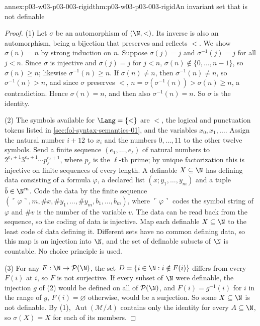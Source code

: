 \begin{annexitem}{annex:p03-w03-p03-003-rigid}{thm:p03-w03-p03-003-rigid}{An invariant set that is not definable}
\begin{proof}
(1) Let \(\sigma\) be an automorphism of \((\N,<)\).  Its inverse is also an
automorphism, being a bijection that preserves and reflects \(<\).  We show
\(\sigma(n)=n\) by strong induction on \(n\).  Suppose \(\sigma(j)=j\) and
\(\sigma^{-1}(j)=j\) for all \(j<n\).  Since \(\sigma\) is injective and
\(\sigma(j)=j\) for \(j<n\), \(\sigma(n)\notin\{0,\ldots,n-1\}\), so
\(\sigma(n)\geq n\); likewise \(\sigma^{-1}(n)\geq n\).  If
\(\sigma(n)\neq n\), then \(\sigma^{-1}(n)\neq n\), so \(\sigma^{-1}(n)>n\),
and since \(\sigma\) preserves \(<\),
\(n=\sigma(\sigma^{-1}(n))>\sigma(n)\geq n\), a contradiction.  Hence
\(\sigma(n)=n\), and then also \(\sigma^{-1}(n)=n\).  So \(\sigma\) is the
identity.

(2) The symbols available for \(\Lang=\{<\}\) are \(<\), the logical and
punctuation tokens listed in \cref{sec:fol-syntax-semantics-01}, and the
variables \(x_0,x_1,\ldots\).  Assign the natural number \(i+12\) to
\(x_i\) and the numbers \(0,\ldots,11\) to the other twelve symbols.  Send a
finite sequence \((e_1,\ldots,e_\ell)\) of natural numbers to
\(2^{e_1+1}3^{e_2+1}\cdots p_\ell^{e_\ell+1}\), where \(p_\ell\) is the
\(\ell\)-th prime; by unique factorization this is injective on finite
sequences of every length.  A definable \(X\subseteq\N\) has defining data
consisting of a formula \(\varphi\), a declared list \((x;y_1,\ldots,y_m)\)
and a tuple \(\bar b\in\N^m\).  Code the data by the finite sequence
\((\ulcorner\varphi\urcorner,m,\#x,\#y_1,\ldots,\#y_m,b_1,\ldots,b_m)\),
where \(\ulcorner\varphi\urcorner\) codes the symbol string of \(\varphi\)
and \(\#v\) is the number of the variable \(v\).  The data can be read back
from the sequence, so the coding of data is injective.  Map each definable
\(X\subseteq\N\) to the least code of data defining it.  Different sets
have no common defining data, so this map is an injection into \(\N\), and
the set of definable subsets of \(\N\) is countable.  No choice principle is
used.

(3) For any \(F:\N\to\mathcal P(\N)\), the set
\(D=\{i\in\N:i\notin F(i)\}\) differs from every \(F(i)\) at \(i\), so
\(F\) is not surjective.  If every subset of \(\N\) were definable, the
injection \(g\) of (2) would be defined on all of \(\mathcal P(\N)\), and
\(F(i)=g^{-1}(i)\) for \(i\) in the range of \(g\), \(F(i)=\varnothing\)
otherwise, would be a surjection.  So some \(X\subseteq\N\) is not
definable.  By (1), \(\operatorname{Aut}(\mathcal M/A)\) contains only the
identity for every \(A\subseteq\N\), so \(\sigma(X)=X\) for each of its
members.
\end{proof}
\end{annexitem}


